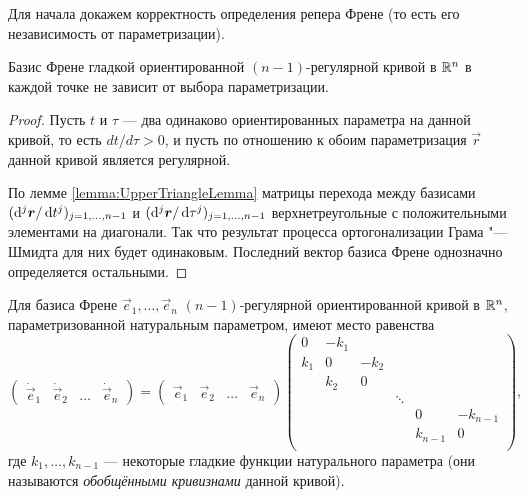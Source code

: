 Для начала докажем корректность определения репера Френе (то есть его независимость от параметризации).

\begin{proposition}
	Базис Френе гладкой ориентированной $(n - 1)$-регулярной кривой в $\mathbb{R}^n$ в каждой точке не зависит от выбора параметризации.
\end{proposition}

\begin{proof}
	Пусть $t$ и $\tau$ --- два одинаково ориентированных параметра на данной кривой, то есть $dt / d\tau > 0$, и пусть по отношению к обоим параметризация $\vec{r}$ данной кривой является регулярной.

	По лемме \ref{lemma:UpperTriangleLemma} матрицы перехода между базисами $(\mathop{}\!\mathrm{d}^j\boldsymbol{r} / \mathop{}\!\mathrm{d} t^j)_{j = 1, \ldots, {n - 1}}$ и $(\mathop{}\!\mathrm{d}^j\boldsymbol{r} / \mathop{}\!\mathrm{d}\tau^j)_{j = 1, \ldots, {n - 1}}$ верхнетреугольные с положительными элементами на диагонали. Так что результат процесса ортогонализации Грама "---Шмидта для них будет одинаковым. Последний вектор базиса Френе однозначно определяется остальными.
\end{proof}

\begin{theorem} \label{theorem:CurveRn}
	Для базиса Френе $\vec{e}_1, \ldots, \vec{e}_n$ $(n - 1)$-регулярной ориентированной кривой в $\mathbb{R}^n$, параметризованной натуральным параметром, имеют место равенства
	\[
		\begin{pmatrix}
			\dot{\vec{e}}_1 & \dot{\vec{e}}_2 & \ldots & \dot{\vec{e}}_n
		\end{pmatrix} =
		\begin{pmatrix}
			\vec{e}_1 & \vec{e}_2 & \ldots & \vec{e}_n
		\end{pmatrix}
		\begin{pmatrix}
			0 & -k_1 & & & & \\
			k_1 & 0 & -k_2 & & & \\
			 & k_2 & 0 & & & \\
			 & & & \ddots & & \\
			 & & & & 0 & -k_{n - 1}\\
			 & & & & k_{n - 1} & 0\\
		\end{pmatrix},
	\]
	где $k_1, \ldots, k_{n - 1}$ --- некоторые гладкие функции натурального параметра (они называются \textit{обобщёнными кривизнами} данной кривой).
\end{theorem}

